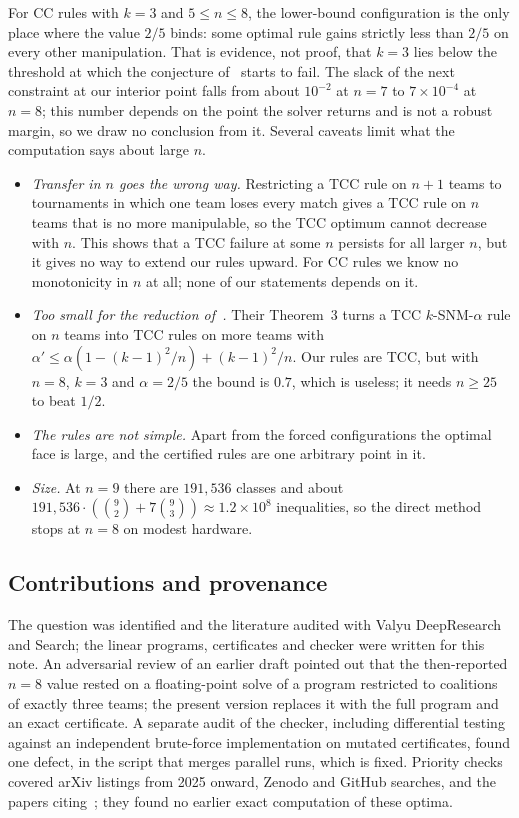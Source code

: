 \documentclass[11pt]{amsart}
\theoremstyle{definition}
\theoremstyle{remark}
\begin{document}
For CC rules with $k=3$ and $5\le n\le8$, the lower-bound configuration is the only place where the value $2/5$ binds: some optimal rule gains strictly less than $2/5$ on every other manipulation. That is evidence, not proof, that $k=3$ lies below the threshold at which the conjecture of~\cite{SSW17} starts to fail. The slack of the next constraint at our interior point falls from about $10^{-2}$ at $n=7$ to $7\times10^{-4}$ at $n=8$; this number depends on the point the solver returns and is not a robust margin, so we draw no conclusion from it. Several caveats limit what the computation says about large $n$.
\begin{itemize}
\item \emph{Transfer in $n$ goes the wrong way.} Restricting a TCC rule on $n+1$ teams to tournaments in which one team loses every match gives a TCC rule on $n$ teams that is no more manipulable, so the TCC optimum cannot decrease with $n$. This shows that a TCC failure at some $n$ persists for all larger $n$, but it gives no way to extend our rules upward. For CC rules we know no monotonicity in $n$ at all; none of our statements depends on it.
\item \emph{Too small for the reduction of~\cite{MSS24}.} Their Theorem~3 turns a TCC $k$-SNM-$\alpha$ rule on $n$ teams into TCC rules on more teams with $\alpha'\le\alpha(1-(k-1)^2/n)+(k-1)^2/n$. Our rules are TCC, but with $n=8$, $k=3$ and $\alpha=2/5$ the bound is $0.7$, which is useless; it needs $n\ge25$ to beat $1/2$.
\item \emph{The rules are not simple.} Apart from the forced configurations the optimal face is large, and the certified rules are one arbitrary point in it.
\item \emph{Size.} At $n=9$ there are $191{,}536$ classes and about $191{,}536\cdot(\binom92+7\binom93)\approx1.2\times10^8$ inequalities, so the direct method stops at $n=8$ on modest hardware.
\end{itemize}

\subsection*{Contributions and provenance}
The question was identified and the literature audited with Valyu DeepResearch and Search; the linear programs, certificates and checker were written for this note. An adversarial review of an earlier draft pointed out that the then-reported $n=8$ value rested on a floating-point solve of a program restricted to coalitions of exactly three teams; the present version replaces it with the full program and an exact certificate. A separate audit of the checker, including differential testing against an independent brute-force implementation on mutated certificates, found one defect, in the script that merges parallel runs, which is fixed. Priority checks covered arXiv listings from 2025 onward, Zenodo and GitHub searches, and the papers citing~\cite{SSW17,SWZZ20,DW22,MSS24}; they found no earlier exact computation of these optima.



\end{document}
